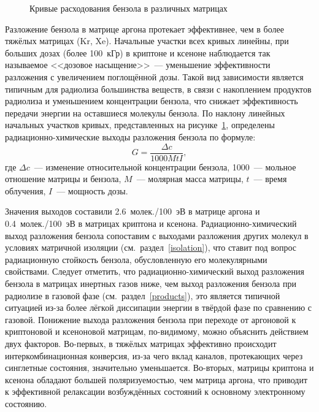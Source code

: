 {\begin{figure}[H]
\caption{Кривые расходования бензола в различных матрицах}
\label{conv}
\end{figure}

Разложение бензола в матрице аргона протекает эффективнее, чем в более тяжёлых матрицах (Kr, Xe). Начальные участки всех кривых линейны, при больших дозах (более 100~кГр) в криптоне и ксеноне наблюдается так называемое <<дозовое насыщение>>~---
уменьшение эффективности разложения с увеличением поглощённой дозы. Такой вид зависимости  является типичным для радиолиза большинства веществ, в связи с накоплением продуктов радиолиза и уменьшением концентрации бензола, что снижает эффективность передачи энергии на оставшиеся молекулы бензола. По наклону линейных начальных участков кривых, представленных на рисунке~\ref{conv}, определены радиационно-химические выходы разложения
бензола по формуле:
\begin{equation} \label{yee}
G = \frac{\Delta c}{1000MtI}, 
\end{equation}
где $\Delta c$~--- изменение относительной концентрации бензола, 1000~--- мольное отношение матрицы и бензола, $M$~--- молярная масса матрицы, $t$~--- время облучения, $I$~--- мощность дозы.

Значения выходов составили
2.6~молек./100~эВ в матрице аргона и  0.4~молек./100~эВ в матрицах криптона и ксенона. Радиационно-химический выход разложения бензола сопоставим с 
выходами разложения других молекул в условиях матричной изоляции (см.~раздел~\ref{isolation}), что ставит под вопрос радиационную стойкость бензола, обусловленную его молекулярными свойствами.
 Следует отметить, что радиационно-химический выход разложения бензола в матрицах инертных газов ниже, чем выход разложения бензола при радиолизе в газовой фазе (см.~раздел~\ref{products}), это является типичной ситуацией из-за более лёгкой диссипации энергии в твёрдой фазе по сравнению с газовой.
Понижение выхода разложения бензола при переходе от аргоновой к криптоновой и ксеноновой матрицам, по-видимому, можно объяснить действием двух факторов. 
Во-первых, в тяжёлых матрицах эффективно происходит интеркомбинационная конверсия, из-за чего вклад каналов, 
протекающих через синглетные состояния, значительно уменьшается. Во-вторых, матрицы криптона и ксенона обладают большей поляризуемостью, чем матрица аргона, что приводит
к эффективной релаксации возбуждённых состояний к основному электронному состоянию.


}
